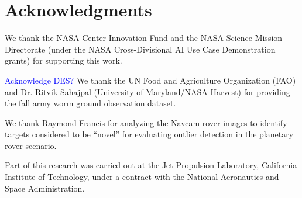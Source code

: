 \documentclass[letterpaper]{article} %
\newcommand{\todo}[1]{\textcolor{blue}{#1}}
\begin{document}



\section{Acknowledgments}
We thank the NASA Center Innovation Fund and the NASA Science Mission 
Directorate (under the NASA Cross-Divisional AI Use Case Demonstration grants)
 for supporting this work.

\todo{Acknowledge DES?}
We thank the UN Food and Agriculture Organization (FAO) and Dr. Ritvik Sahajpal
(University of Maryland/NASA Harvest) for providing the fall army worm ground
 observation dataset.

We thank Raymond Francis for analyzing the Navcam rover images to
identify targets considered to be ``novel'' for evaluating outlier
detection in the planetary rover scenario.

Part of this research was carried out at the Jet Propulsion
Laboratory, California Institute of Technology, under a contract with
the National Aeronautics and Space Administration.
\end{document}
